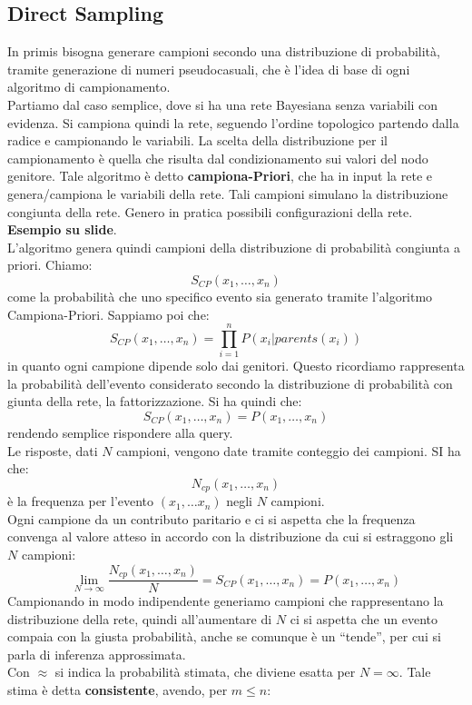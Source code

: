 \documentclass[a4paper,12pt, oneside]{book}
\begin{document}
\subsection{Direct Sampling}
In primis bisogna generare campioni secondo una distribuzione di probabilità,
tramite generazione di numeri pseudocasuali, che è l'idea di base di ogni
algoritmo di campionamento. \\
Partiamo dal caso semplice, dove si ha una rete Bayesiana senza variabili con
evidenza. Si campiona quindi la rete, seguendo l'ordine topologico partendo
dalla radice e campionando le variabili. La scelta della distribuzione per il
campionamento è quella che risulta dal condizionamento sui valori del nodo
genitore. Tale algoritmo è detto \textbf{campiona-Priori}, che ha in input la
rete e genera/campiona le variabili della rete. Tali campioni simulano la
distribuzione congiunta della rete. Genero in pratica possibili configurazioni
della rete. \\
\textbf{Esempio su slide}.\\
L'algoritmo genera quindi campioni della distribuzione di probabilità congiunta
a priori. Chiamo:
\[S_{CP}(x_1,\ldots,x_n)\]
come la probabilità che uno specifico evento sia generato tramite l’algoritmo
Campiona-Priori. Sappiamo poi che:
\[S_{CP}(x_1,\ldots,x_n)=\prod_{i=1}^nP(x_i|parents(x_i))\]
in quanto ogni campione dipende solo dai genitori. Questo ricordiamo rappresenta
la probabilità dell'evento considerato secondo la distribuzione di probabilità
con giunta della rete, la fattorizzazione. Si ha quindi che:
\[S_{CP}(x_1,\ldots,x_n)=P(x_1,\ldots,x_n)\]
rendendo semplice rispondere alla query.\\
Le risposte, dati $N$ campioni, vengono date tramite conteggio dei campioni. SI
ha che:
\[N_{cp}(x_1,\ldots,x_n)\]
è la frequenza per l'evento $(x_1,\ldots x_n)$ negli $N$ campioni.\\
Ogni campione da un contributo paritario e ci si aspetta che la frequenza
convenga al valore atteso in accordo con la distribuzione da cui si estraggono
gli $N$ campioni:
\[\lim_{N\to\infty}\frac{N_{cp}(x_1,\ldots,x_n)}{N}
  =S_{CP}(x_1,\ldots,x_n)=P(x_1,\ldots,x_n)\]
Campionando in modo indipendente generiamo campioni che rappresentano la
distribuzione della rete, quindi all'aumentare di $N$ ci si aspetta che un
evento compaia con la giusta probabilità, anche se comunque è un ``tende'', per
cui si parla di inferenza approssimata.\\
Con $\approx$ si indica la probabilità stimata, che diviene esatta per
$N=\infty$. Tale stima è detta \textbf{consistente}, avendo, per $m\leq n$:
\end{document}
